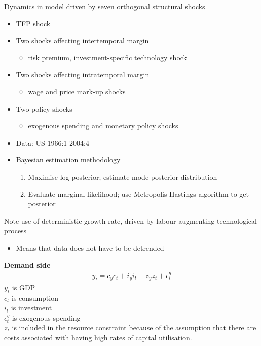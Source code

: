 \documentclass{beamer}
\begin{document}
\begin{frame}
 Dynamics in model driven by seven orthogonal structural shocks
 \begin{itemize}
   \item TFP shock
   \item Two shocks affecting intertemporal margin
   \begin{itemize}
     \item risk premium, investment-specific technology shock
   \end{itemize}
   \item Two shocks affecting intratemporal margin
   \begin{itemize}
     \item wage and price mark-up shocks
   \end{itemize}
   \item Two policy shocks
   \begin{itemize}
     \item exogenous spending and monetary policy shocks
   \end{itemize}
 \end{itemize}
\end{frame}

\begin{frame}
  \begin{itemize}
    \item Data: US 1966:1-2004:4
    \item Bayesian estimation methodology
    \begin{enumerate}
      \item Maximise log-posterior; estimate mode posterior distribution
      \item Evaluate marginal likelihood; use Metropolis-Hastings algorithm to get posterior
    \end{enumerate}    
  \end{itemize}
  Note use of deterministic growth rate, driven by labour-augmenting technological process
  \begin{itemize}
    \item Means that data does not have to be detrended
  \end{itemize}
\end{frame}

\begin{frame}
 \textbf{Demand side}  
\begin{align}
  y_t = c_y c_t + i_y i_t + z_y z_t + \epsilon_t^g
\end{align}
$y_t$ is GDP\\
$c_t$ is consumption\\ 
$i_t$ is investment\\
$\epsilon_t^g$ is exogenous spending\\
\medskip
$z_t$ is included in the resource constraint because of the assumption that there are costs associated with having high rates of capital utilisation. 
\end{frame}
\end{document}
